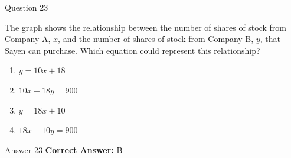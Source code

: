 \documentclass{beamer}
\begin{document}
\begin{frame}{Question 23}
\small
\begin{center}
\end{center}

The graph shows the relationship between the number of shares of stock from Company A, $x$,  
and the number of shares of stock from Company B, $y$, that Sayen can purchase.  
Which equation could represent this relationship?
\vspace{0.35cm}
\begin{enumerate}
    \item[A.] $y = 10x + 18$
    \item[B.] $10x + 18y = 900$
    \item[C.] $y = 18x + 10$
    \item[D.] $18x + 10y = 900$
\end{enumerate}
\end{frame}
\begin{frame}{Answer 23}
\small
\textbf{Correct Answer:} B
\end{frame}
\end{document}
